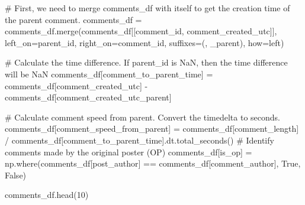 \documentclass[
  12pt,
  letterpaper,
  DIV=11,
  numbers=noendperiod]{scrartcl}
\newenvironment{Shaded}{\begin{snugshade}}{\end{snugshade}}
\newcommand{\CommentTok}[1]{\textcolor[rgb]{0.37,0.37,0.37}{#1}}
\newcommand{\DecValTok}[1]{\textcolor[rgb]{0.68,0.00,0.00}{#1}}
\newcommand{\NormalTok}[1]{\textcolor[rgb]{0.00,0.23,0.31}{#1}}
\newcommand{\OperatorTok}[1]{\textcolor[rgb]{0.37,0.37,0.37}{#1}}
\newcommand{\StringTok}[1]{\textcolor[rgb]{0.13,0.47,0.30}{#1}}
\newcommand{\VariableTok}[1]{\textcolor[rgb]{0.07,0.07,0.07}{#1}}
\begin{document}
\begin{Shaded}
\begin{Highlighting}[]
\CommentTok{\# First, we need to merge comments\_df with itself to get the creation time of the parent comment.}
\NormalTok{comments\_df }\OperatorTok{=}\NormalTok{ comments\_df.merge(comments\_df[[}\StringTok{\textquotesingle{}comment\_id\textquotesingle{}}\NormalTok{, }\StringTok{\textquotesingle{}comment\_created\_utc\textquotesingle{}}\NormalTok{]], left\_on}\OperatorTok{=}\StringTok{\textquotesingle{}parent\_id\textquotesingle{}}\NormalTok{, right\_on}\OperatorTok{=}\StringTok{\textquotesingle{}comment\_id\textquotesingle{}}\NormalTok{, suffixes}\OperatorTok{=}\NormalTok{(}\StringTok{\textquotesingle{}\textquotesingle{}}\NormalTok{, }\StringTok{\textquotesingle{}\_parent\textquotesingle{}}\NormalTok{), how}\OperatorTok{=}\StringTok{\textquotesingle{}left\textquotesingle{}}\NormalTok{)}

\CommentTok{\# Calculate the time difference.  If parent\_id is NaN, then the time difference will be NaN}
\NormalTok{comments\_df[}\StringTok{\textquotesingle{}comment\_to\_parent\_time\textquotesingle{}}\NormalTok{] }\OperatorTok{=}\NormalTok{ comments\_df[}\StringTok{\textquotesingle{}comment\_created\_utc\textquotesingle{}}\NormalTok{] }\OperatorTok{{-}}\NormalTok{ comments\_df[}\StringTok{\textquotesingle{}comment\_created\_utc\_parent\textquotesingle{}}\NormalTok{]}

\CommentTok{\# Calculate comment speed from parent. Convert the timedelta to seconds.}
\NormalTok{comments\_df[}\StringTok{\textquotesingle{}comment\_speed\_from\_parent\textquotesingle{}}\NormalTok{] }\OperatorTok{=}\NormalTok{ comments\_df[}\StringTok{\textquotesingle{}comment\_length\textquotesingle{}}\NormalTok{] }\OperatorTok{/}\NormalTok{ comments\_df[}\StringTok{\textquotesingle{}comment\_to\_parent\_time\textquotesingle{}}\NormalTok{].dt.total\_seconds()}
\CommentTok{\# Identify comments made by the original poster (OP)}
\NormalTok{comments\_df[}\StringTok{\textquotesingle{}is\_op\textquotesingle{}}\NormalTok{] }\OperatorTok{=}\NormalTok{ np.where(comments\_df[}\StringTok{\textquotesingle{}post\_author\textquotesingle{}}\NormalTok{] }\OperatorTok{==}\NormalTok{ comments\_df[}\StringTok{\textquotesingle{}comment\_author\textquotesingle{}}\NormalTok{], }\VariableTok{True}\NormalTok{, }\VariableTok{False}\NormalTok{)}

\NormalTok{comments\_df.head(}\DecValTok{10}\NormalTok{)}
\end{Highlighting}
\end{Shaded}
\end{document}

